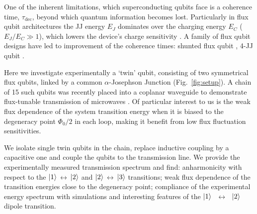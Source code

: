 \documentclass[%
reprint,
superscriptaddress,
bibnotes,
amsmath,
amssymb,
aps,
showkeys,
prb,
]{revtex4-2}
\newcommand{\iket}[1]{\ensuremath{\Ket{#1}}}
\newcommand{\ilra}{\ensuremath{\,\leftrightarrow\,}}
\begin{document}
One  of the  inherent limitations,  which  superconducting qubits  face is  a coherence  time,
$\tau_{\text{dec}}$, beyond  which quantum information  becomes lost. Particularly in  flux qubit
architectures the JJ  energy $E_J$ dominates over  the charging energy $E_C$  ($E_J/E_C \gg 1$),
which lowers  the device's  charge sensitivity  \cite{Orlando_1999,Chiorescu_2003,Mooij_1999}.  A
family  of flux qubit designs  have led to  improvement of the coherence  times: shunted
flux qubit \cite{Yan_2016} , 4-JJ qubit \cite{Qiu_2016,Pop_2014}.


Here we investigate experimentally a `twin'  qubit, consisting of two symmetrical flux qubits,
linked by a common $ \alpha$-Josephson Junction  (Fig.~\ref{fig:setup}).  A chain of 15 such qubits
was recently  placed into  a coplanar  waveguide to  demonstrate flux-tunable  transmission of
microwaves \cite{Shulga_2018}.  Of particular interest to us is the weak flux dependence of the
system transition  energy when  it is  biased to the  degeneracy point  $\Phi_0/2 $ in each loop,  making it
benefit from low flux fluctuation sensitivities.
 
We  isolate single twin qubits in the chain, replace inductive coupling by a capacitive one and couple the qubits to the  transmission line. We
provide the experimentally measured transmission spectrum and find: anharmonicity
with respect  to the  \iket{1}\ilra\iket{2} and  \iket{2}\ilra\iket{3} transitions;  weak flux
dependence  of the  transition  energies close  to  the degeneracy  point;  compliance of  the
experimental   energy   spectrum   with   simulations  and   interesting   features   of   the
\iket{1}~\ilra~\iket{2} dipole transition.
\end{document}
